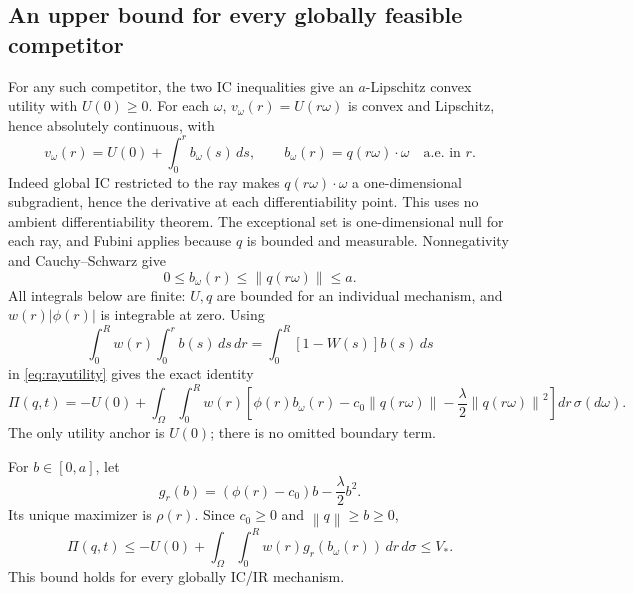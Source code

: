 \documentclass[11pt,a4paper]{article}
\numberwithin{equation}{section}
\newcommand{\norm}[1]{\left\lVert #1\right\rVert}
\begin{document}
\subsection{An upper bound for every globally feasible competitor}
For any such competitor, the two IC inequalities give an
\(a\)-Lipschitz convex utility with \(U(0)\ge0\).
For each \(\omega\), \(v_\omega(r)=U(r\omega)\) is convex and Lipschitz,
hence absolutely continuous, with
\begin{equation}\label{eq:rayutility}
 v_\omega(r)=U(0)+\int_0^r b_\omega(s)\,ds,\qquad
 b_\omega(r)=q(r\omega)\cdot\omega\quad\text{a.e. in }r.
\end{equation}
Indeed global IC restricted to the ray makes \(q(r\omega)\cdot\omega\)
a one-dimensional subgradient, hence the derivative at each
differentiability point. This uses no ambient differentiability theorem.
The exceptional set is one-dimensional null for each ray, and Fubini
applies because \(q\) is bounded and measurable.
Nonnegativity and Cauchy--Schwarz give
\[
 0\le b_\omega(r)\le\norm{q(r\omega)}\le a.
\]
All integrals below are finite: \(U,q\) are bounded for an individual
mechanism, and \(w(r)|\phi(r)|\) is integrable at zero.
Using
\[
 \int_0^Rw(r)\int_0^r b(s)\,ds\,dr
 =\int_0^R[1-W(s)]b(s)\,ds
\]
in \eqref{eq:rayutility} gives the exact identity
\begin{equation}\label{eq:radialprofitidentity}
 \Pi(q,t)=-U(0)+
 \int_\Omega\int_0^Rw(r)
 \left[\phi(r)b_\omega(r)-c_0\norm{q(r\omega)}
                  -\frac{\lambda}{2}\norm{q(r\omega)}^2\right]
 dr\,\sigma(d\omega).
\end{equation}
The only utility anchor is \(U(0)\); there is no omitted boundary term.

For \(b\in[0,a]\), let
\[
 g_r(b)=(\phi(r)-c_0)b-\frac{\lambda}{2}b^2.
\]
Its unique maximizer is \(\rho(r)\).
Since \(c_0\ge0\) and \(\norm q\ge b\ge0\),
\begin{equation}\label{eq:radialupper}
 \Pi(q,t)
 \le-U(0)+\int_\Omega\int_0^Rw(r)g_r(b_\omega(r))\,dr\,d\sigma
 \le V_*.
\end{equation}
This bound holds for every globally IC/IR mechanism.
\end{document}
